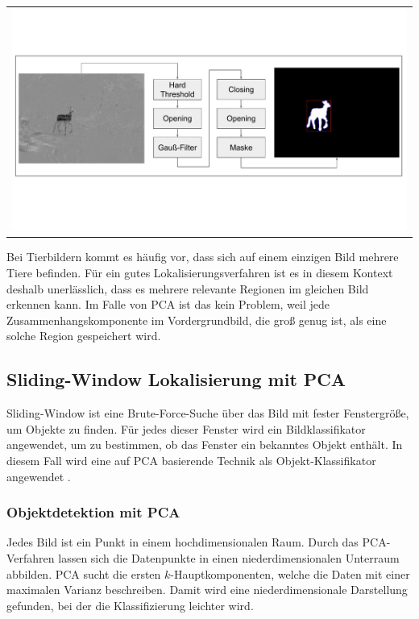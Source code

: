 \begin{center}
\begin{tabular}{c}
\includegraphics[trim={0 3cm 0cm 3cm},clip=true,width=13cm]{img/Segmentierung/pipe.pdf}
\end{tabular}
\label{fig:pipe}
\end{center}

Bei Tierbildern kommt es häufig vor, dass sich auf einem einzigen Bild mehrere Tiere befinden. Für ein gutes Lokalisierungsverfahren ist es in diesem Kontext deshalb unerlässlich, dass es mehrere relevante Regionen im gleichen Bild erkennen kann. Im Falle von PCA ist das kein Problem, weil jede Zusammenhangskomponente im Vordergrundbild, die groß genug ist, als eine solche Region gespeichert wird.

\subsection{Sliding-Window Lokalisierung mit PCA}
Sliding-Window ist eine Brute-Force-Suche über das Bild mit fester Fenstergröße, um Objekte zu finden. Für jedes dieser Fenster wird ein Bildklassifikator angewendet, um zu bestimmen, ob das Fenster ein bekanntes Objekt enthält. In diesem Fall wird eine auf PCA basierende Technik als Objekt-Klassifikator angewendet \cite{belhumeur1997eigenfaces}.

\subsubsection{Objektdetektion mit PCA}
Jedes Bild ist ein Punkt in einem hochdimensionalen Raum. Durch das PCA-Verfahren lassen sich die Datenpunkte in einen niederdimensionalen Unterraum abbilden. PCA sucht die ersten $k$-Hauptkomponenten, welche die Daten mit einer maximalen Varianz beschreiben. Damit wird eine niederdimensionale Darstellung gefunden, bei der die Klassifizierung leichter wird.\\

